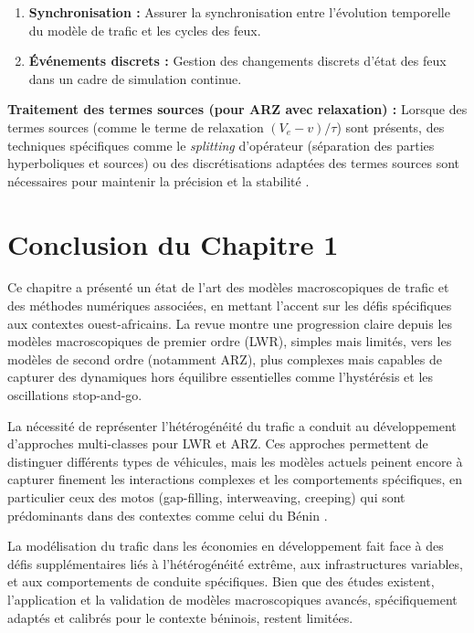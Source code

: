 \begin{enumerate}
    \item \textbf{Synchronisation :} Assurer la synchronisation entre l'évolution temporelle du modèle de trafic et les cycles des feux.
    \item \textbf{Événements discrets :} Gestion des changements discrets d'état des feux dans un cadre de simulation continue.
\end{enumerate}

\textbf{Traitement des termes sources (pour ARZ avec relaxation) :} Lorsque des termes sources (comme le terme de relaxation $(V_e - v)/\tau$) sont présents, des techniques spécifiques comme le \textit{splitting} d'opérateur (séparation des parties hyperboliques et sources) ou des discrétisations adaptées des termes sources sont nécessaires pour maintenir la précision et la stabilité \cite{kolb2018pareto}.


\section{Conclusion du Chapitre 1}
Ce chapitre a présenté un état de l'art des modèles macroscopiques de trafic et des méthodes numériques associées, en mettant l'accent sur les défis spécifiques aux contextes ouest-africains. La revue montre une progression claire depuis les modèles macroscopiques de premier ordre (LWR), simples mais limités, vers les modèles de second ordre (notamment ARZ), plus complexes mais capables de capturer des dynamiques hors équilibre essentielles comme l'hystérésis et les oscillations stop-and-go.

La nécessité de représenter l'hétérogénéité du trafic a conduit au développement d'approches multi-classes pour LWR et ARZ. Ces approches permettent de distinguer différents types de véhicules, mais les modèles actuels peinent encore à capturer finement les interactions complexes et les comportements spécifiques, en particulier ceux des motos (gap-filling, interweaving, creeping) qui sont prédominants dans des contextes comme celui du Bénin \cite{Saumtally2012}.

La modélisation du trafic dans les économies en développement fait face à des défis supplémentaires liés à l'hétérogénéité extrême, aux infrastructures variables, et aux comportements de conduite spécifiques. Bien que des études existent, l'application et la validation de modèles macroscopiques avancés, spécifiquement adaptés et calibrés pour le contexte béninois, restent limitées.

